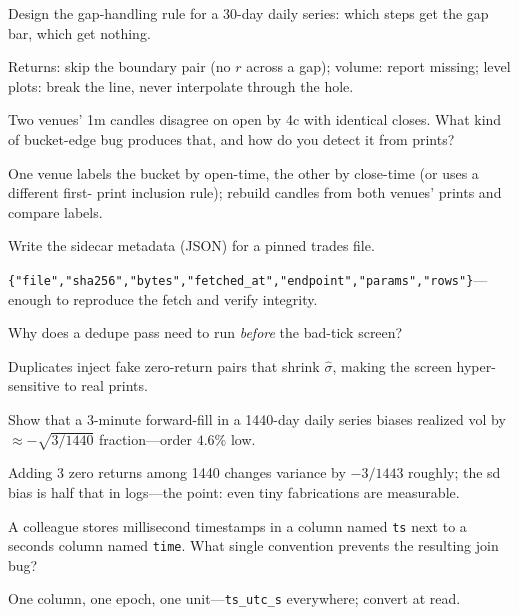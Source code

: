 \begin{exercise}
Design the gap-handling rule for a 30-day daily series: which steps get the gap bar, which
get nothing.
\end{exercise}
\begin{solution}
Returns: skip the boundary pair (no $r$ across a gap); volume: report missing; level plots:
break the line, never interpolate through the hole.
\end{solution}

\begin{exercise}
Two venues' 1m candles disagree on open by 4c with identical closes. What kind of bucket-edge
bug produces that, and how do you detect it from prints?
\end{exercise}
\begin{solution}
One venue labels the bucket by open-time, the other by close-time (or uses a different first-
print inclusion rule); rebuild candles from both venues' prints and compare labels.
\end{solution}

\begin{exercise}
Write the sidecar metadata (JSON) for a pinned trades file.
\end{exercise}
\begin{solution}
\verb|{"file","sha256","bytes","fetched_at","endpoint","params","rows"}|---enough to
reproduce the fetch and verify integrity.
\end{solution}

\begin{exercise}
Why does a dedupe pass need to run \emph{before} the bad-tick screen?
\end{exercise}
\begin{solution}
Duplicates inject fake zero-return pairs that shrink $\hat\sigma$, making the screen
hyper-sensitive to real prints.
\end{solution}

\begin{exercise}
Show that a 3-minute forward-fill in a 1440-day daily series biases realized vol by
$\approx-\sqrt{3/1440}$ fraction---order $4.6\%$ low.
\end{exercise}
\begin{solution}
Adding 3 zero returns among 1440 changes variance by $-3/1443$ roughly; the sd bias is half
that in logs---the point: even tiny fabrications are measurable.
\end{solution}

\begin{exercise}
A colleague stores millisecond timestamps in a column named \texttt{ts} next to a seconds
column named \texttt{time}. What single convention prevents the resulting join bug?
\end{exercise}
\begin{solution}
One column, one epoch, one unit---\texttt{ts\_utc\_s} everywhere; convert at read.
\end{solution}

